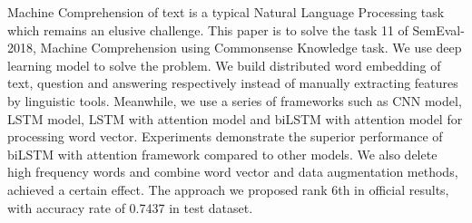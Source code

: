 Machine Comprehension of text is a typical Natural Language Processing task which remains an elusive challenge. This paper is to solve the task 11 of SemEval-2018, Machine Comprehension using Commonsense Knowledge task. We use deep learning model to solve the problem. We build distributed word embedding of text, question and answering respectively instead of manually extracting features by linguistic tools. Meanwhile, we use a series of frameworks such as CNN model, LSTM model, LSTM with attention model and biLSTM with attention model for processing word vector. Experiments demonstrate the superior performance of biLSTM with attention framework compared to other models. We also delete high frequency words and combine word vector and data augmentation methods, achieved a certain effect. The approach we proposed rank 6th in official results, with accuracy rate of 0.7437 in test dataset.
